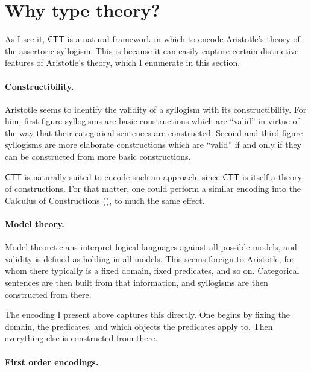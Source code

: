 \documentclass{article}
\newcommand\e{\mathsf}
\def\CTT/{$\e{CTT}$}
\begin{document}
\section{Why type theory?}

As I see it, \CTT/ is a natural framework in which to encode Aristotle's theory of the assertoric syllogism. This is because it can easily capture certain distinctive features of Aristotle's theory, which I enumerate in this section.


\paragraph{Constructibility.} 

Aristotle seems to identify the validity of a syllogism with its constructibility. For him, first figure syllogisms are basic constructions which are ``valid'' in virtue of the way that their categorical sentences are constructed. Second and third figure syllogisms are more elaborate constructions which are ``valid'' if and only if they can be constructed from more basic constructions.

\CTT/ is naturally suited to encode such an approach, since \CTT/ is itself a theory of constructions. For that matter, one could perform a similar encoding into the Calculus of Constructions (\citealt{CoquandHuet1988}), to much the same effect.


\paragraph{Model theory.}

Model-theoreticians interpret logical languages against all possible models, and validity is defined as holding in all models. This seems foreign to Aristotle, for whom there typically is a fixed domain, fixed predicates, and so on. Categorical sentences are then built from that information, and syllogisms are then constructed from there.

The encoding I present above captures this directly. One begins by fixing the domain, the predicates, and which objects the predicates apply to. Then everything else is constructed from there. 


\paragraph{First order encodings.}
\end{document}

